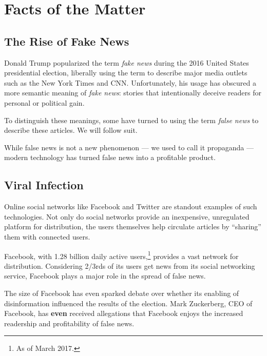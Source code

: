

\section{Facts of the Matter}

\subsection{The Rise of Fake News}

\par Donald Trump popularized the term \emph{fake news} during the 2016 United States presidential election, liberally using the term to describe major media outlets such as the New York Times and CNN. \cite{telegraph_fn} Unfortunately, his usage has obscured a more semantic meaning of \emph{fake news}: stories that intentionally deceive readers for personal or political gain. \cite{npr_fn}

\par To distinguish these meanings, some have turned to using the term \emph{false news} to describe these articles. \cite{guardian_tips} We will follow suit.

\par While false news is not a new phenomenon --- we used to call it propaganda --- modern technology has turned false news into a profitable product. \cite{bbc_propaganda}

\subsection{Viral Infection}

\par Online social networks like Facebook and Twitter are standout examples of such technologies. Not only do social networks provide an inexpensive, unregulated platform for distribution, \cite{telegraph_fn} the users themselves help circulate articles by ``sharing'' them with connected users. \cite{telegraph_fn} 

\par Facebook, with 1.28 billion daily active users,\footnote{As of March 2017.} \cite{fb_newsroom} provides a vast network for distribution. Considering 2/3rds of its users get news from its social networking service, \cite{pew_news} Facebook plays a major role in the spread of false news.

\par The size of Facebook has even sparked debate over whether its enabling of disinformation influenced the results of the election. \cite{wp_russia,guardian_steps,tc_snowden} Mark Zuckerberg, CEO of Facebook, has \textbf{even} received allegations that Facebook enjoys the increased readership and profitability of false news. \cite{tc_responsibility}

